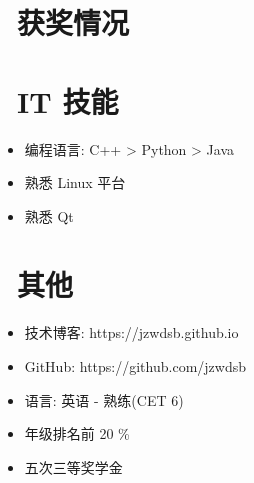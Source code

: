 \documentclass{resume}
\begin{document}

\section{\faHeartO\ 获奖情况}

\section{\faCogs\ IT 技能}
\begin{itemize}[parsep=0.5ex]
  \item 编程语言: C++ > Python > Java
  \item 熟悉 Linux 平台
  \item 熟悉 Qt
\end{itemize}



\section{\faInfo\ 其他}
\begin{itemize}[parsep=0.5ex]
  \item 技术博客: https://jzwdsb.github.io
  \item GitHub: https://github.com/jzwdsb
  \item 语言: 英语 - 熟练(CET 6)
  \item 年级排名前 20 \%
  \item 五次三等奖学金
\end{itemize}

%
%
\end{document}

